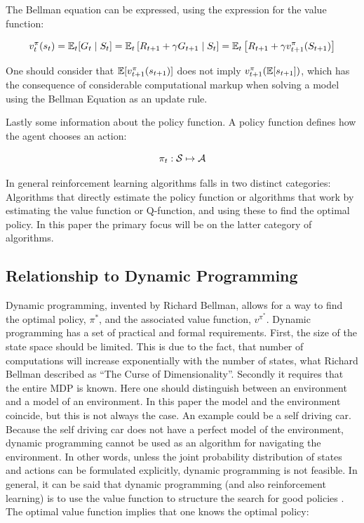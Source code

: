 The Bellman equation can be expressed, using the expression for the value function:

\begin{equation}
    v^{\pi}_{t} (s_t) = \mathbb{E}_t [G_t \mid S_t] = \mathbb{E}_t  \left[ R_{t+1} + \gamma G_{t+1} \mid S_t \right] = \mathbb{E}_t \left[ R_{t+1} + \gamma v_{t+1}^{\pi}(S_{t+1}) \right]
\end{equation}

One should consider that $\mathbb{E} [v_{t+1}^\pi(s_{t+1})]$ does not imply $v_{t+1}^{\pi}(\mathbb{E}[s_{t+1}])$, which has the consequence of considerable computational markup when solving a model using the Bellman Equation as an update rule.

Lastly some information about the policy function.  A policy function defines how the agent chooses an action:

\begin{equation}
    \pi_t : \mathcal{S} \mapsto \mathcal{A} 
\end{equation}

In general reinforcement learning algorithms falls in two distinct categories: Algorithms that directly estimate the policy function or algorithms that work by estimating the value function or Q-function, and using these to find the optimal policy. In this paper the primary focus will be on the latter category of algorithms.

\subsection{Relationship to Dynamic Programming}\label{sec:dynamic_programming}

Dynamic programming, invented by Richard Bellman, allows for a way to find the optimal policy, $\pi^{*}$, and the associated value function, $v^{\pi^{*}}$. Dynamic programming has a set of practical and formal requirements. First, the size of the state space should be limited. This is due to the fact, that number of computations will increase exponentially with the number of states, what Richard Bellman described as ``The Curse of Dimensionality''. Secondly it requires that the entire MDP is known. Here one should distinguish between an environment and a model of an environment. In this paper the model and the environment coincide, but this is not always the case. An example could be a self driving car. Because the self driving car does not have a perfect model of the environment, dynamic programming cannot be used as an algorithm for navigating the environment. In other words, unless the joint probability distribution of states and actions can be formulated explicitly, dynamic programming is not feasible. In general, it can be said that dynamic programming (and also reinforcement learning) is to use the value function to structure the search for good policies  \parencite{sutton_reinforcement_2018}.  The optimal value function  implies that one knows the optimal policy:

